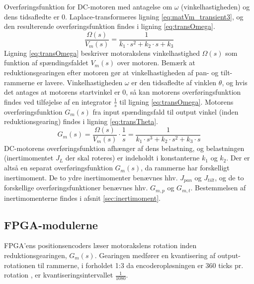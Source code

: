 Overføringsfunktion for DC-motoren med antagelse om \(\omega\) (vinkelhastigheden) og dens tidsafledte er 0.
Laplace-transformeres ligning \ref{eq:matVm_transient3}, og den resulterende overføringsfunktion findes
i ligning \ref{eq:transOmega}.
\begin{equation}
	\frac{\Omega\left(s\right)}{V_m\left(s\right)}=\frac{1}{k_1\cdot{}s^2+k_2\cdot{}s+k_3}
	\label{eq:transOmega}
 \end{equation}
Ligning \ref{eq:transOmega} beskriver motorakslens vinkelhastighed \(\Omega\left(s\right)\) som funktion af spændingsfaldet
\(V_m\left(s\right)\) over motoren. Bemærk at reduktionsgearingen efter motoren gør at vinkelhastigheden af pan- og tilt-rammerne er lavere.
Vinkelhastigheden \(\omega\) er den tidsafledte af vinklen \(\theta\),
og hvis det antages at motorens startvinkel er 0, så kan motorens overføringsfunktion
findes ved tilføjelse af en integrator \(\frac{1}{s}\) til ligning \ref{eq:transOmega}.
Motorens overføringsfunktion \(G_m\left(s\right)\) fra input spændingsfald til output vinkel (inden reduktionsgearing) findes
i ligning \ref{eq:transTheta}.
\begin{equation}
	G_m\left(s\right)=\frac{\Omega\left(s\right)}{V_m\left(s\right)}\cdot{}\frac{1}{s}=\frac{1}{k_1\cdot{}s^3+k_2\cdot{}s^2+k_3\cdot{}s}
	\label{eq:transTheta}
\end{equation}
DC-motorens overføringsfunktion afhænger af dens belastning,
og belastningen (inertimomentet \(J_L\) der skal roteres) er indeholdt i konstanterne \(k_1\) og \(k_2\).
Der er altså en separat overføringsfunktion \(G_m\left(s\right)\),
da rammerne har forskelligt inertimoment.
De to ydre inertimomenter benævnes hhv. \(J_{pan}\) og \(J_{tilt}\),
og de to forskellige overføringsfunktioner benævnes hhv. \(G_{m,p}\) og \(G_{m,t}\).
Bestemmelsen af inertimomenterne findes i afsnit \ref{sec:inertimoment}.

\subsection{FPGA-modulerne}
\label{subsec:matFPGA}
FPGA'ens positionsencoders læser motorakslens rotation inden reduktionsgearingen, \(G_m\left(s\right)\).
Gearingen medfører en kvantisering af output-rotationen til rammerne, i forholdet 1:3 da encoderopløsningen er 360 ticks pr. rotation \citep{emgmotor},
er kvantiseringsintervallet \(\frac{1}{1080}\).

